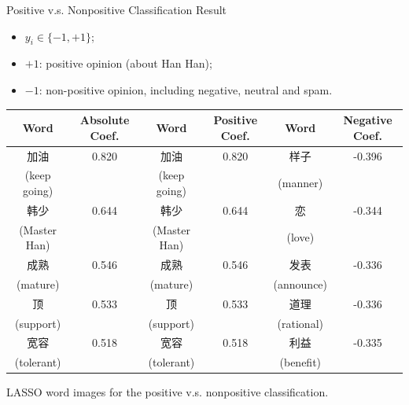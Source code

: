 \documentclass[12pt, trans]{beamer}
\newcommand{\1}[1]{{\mathbf 1}\left\{#1\right\}}        %
\begin{document}
\begin{frame}{Positive v.s. Nonpositive Classification Result}

\begin{itemize}[<+->]
\item $y_i\in\{-1,+1\}$;
\item $+1$: positive opinion (about Han Han);
\item $-1$: non-positive opinion, including negative, neutral and spam.
\end{itemize}

\tiny
\begin{center}
\begin{tabular}{|c|c||c|c||c|c|}
\hline
Word & Absolute Coef. & Word & Positive Coef. & Word & Negative Coef.\\ \hline \hline
加油 & 0.820 & 加油 & 0.820 & 样子 & -0.396\\
(keep going) & & (keep going) & & (manner) & \\\hline
韩少 & 0.644 & 韩少 & 0.644 & 恋 & -0.344\\
(Master Han) & & (Master Han) & & (love) & \\\hline
成熟 & 0.546 & 成熟 & 0.546 & 发表 & -0.336\\
(mature) & & (mature) & & (announce) & \\\hline
顶 & 0.533 & 顶 & 0.533 & 道理 & -0.336\\
(support) & & (support) & & (rational) & \\\hline
宽容 & 0.518 & 宽容 & 0.518 & 利益 & -0.335\\
(tolerant) & & (tolerant) & & (benefit) & \\\hline
\end{tabular}
LASSO word images for the positive v.s. nonpositive classification.
\end{center}


\end{frame}
\end{document}
